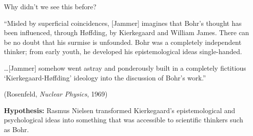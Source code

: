 \documentclass[ignorenonframetext, ]{beamer}
\begin{document}
\begin{frame}{Why didn't we see this before?}

  ``Misled by superficial coincidences, [Jammer] imagines that Bohr's
  thought has been influenced, through Høffding, by Kierkegaard and
  William James. There can be no doubt that his surmise is
  unfounded. Bohr was a completely independent thinker; from early
  youth, he developed his epistemological ideas single-handed.

  \bigskip \dots [Jammer] somehow went astray and ponderously built in
  a completely fictitious `Kierkegaard-Høffding' ideology into the
  discussion of Bohr's work.''

  \medskip (Rosenfeld, \emph{Nuclear Physics}, 1969)

\end{frame}

\begin{frame}

  \textbf{Hypothesis:} Rasmus Nielsen transformed Kierkegaard's
  epistemological and psychological ideas into something that was
  accessible to scientific thinkers such as Bohr.

  \vspace{2em}


\end{frame}

\begin{frame}





\end{frame}
\end{document}
